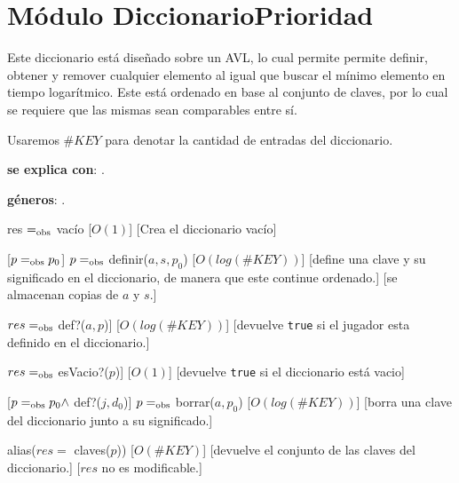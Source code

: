 \section{Módulo DiccionarioPrioridad}

Este diccionario está diseñado sobre un AVL, lo cual permite permite definir, obtener y remover cualquier elemento al igual que buscar el mínimo elemento en tiempo logarítmico. Este está ordenado en base al conjunto de claves, por lo cual se requiere que las mismas sean comparables entre sí.


Usaremos $\#KEY$ para denotar la cantidad de entradas del diccionario.

\begin{Interfaz}
	\textbf{se explica con}: . 

	\textbf{géneros}: .


	{res $=_{\mathrm{obs}}$ vacío}
	[$O(1)$]
	[Crea el diccionario vacío]

	[$p =_{\mathrm{obs}} p_0$]
	{$p =_{\mathrm{obs}}$ definir($a, s, p_0$)}
	[$O(log(\#KEY))$]
	[define una clave y su significado en el diccionario, de manera que este continue ordenado.]
	[se almacenan copias de $a$ y $s$.]

	{$res =_{\mathrm{obs}}$ def?($a, p$)]}
	[$O(log(\#KEY))$]
	[devuelve \texttt{true} si el jugador esta definido en el diccionario.]

	{$res =_{\mathrm{obs}}$ esVacio?($p$)]}
	[$O(1)$]
	[devuelve \texttt{true} si el diccionario está vacio]

	[$p =_{\mathrm{obs}} p_0 \land$ def?($j, d_0$)]
	{$p =_{\mathrm{obs}}$ borrar($a, p_0$)}
	[$O(log(\#KEY))$]
	[borra una clave del diccionario junto a su significado.]

	{alias($res =$ claves($p$))}
	[$O(\#KEY)$]
	[devuelve el conjunto de las claves del diccionario.]
	[$res$ no es modificable.]



\end{Interfaz}
